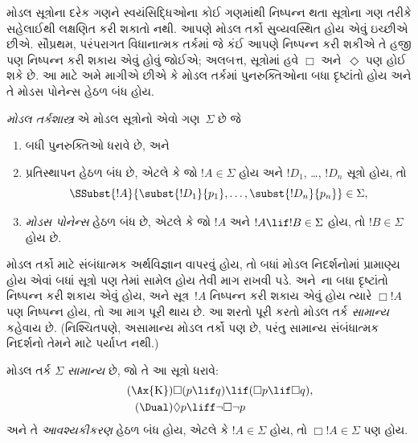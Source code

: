 \begingroup
\makeatletter{}\makeatother


\label{guunit:OLP-0429}


મોડલ સૂત્રોના દરેક ગણને સ્વયંસિદ્ધિઓના કોઈ ગણમાંથી નિષ્પન્ન થતા
સૂત્રોના ગણ તરીકે સહેલાઈથી લક્ષણિત કરી શકાતો નથી. આપણે મોડલ તર્કો
સુવ્યવસ્થિત હોય એવું ઇચ્છીએ છીએ. સૌપ્રથમ, પરંપરાગત વિધાનાત્મક તર્કમાં
જે કંઈ આપણે નિષ્પન્ન કરી શકીએ તે હજી પણ નિષ્પન્ન કરી શકાય એવું હોવું જોઈએ;
અલબત્ત, સૂત્રોમાં હવે $\Box$
    અને~$\Diamond$ પણ હોઈ શકે છે. આ માટે
અમે માગીએ છીએ કે મોડલ તર્કમાં પુનરુક્તિઓના બધા દૃષ્ટાંતો હોય અને તે
મોડસ પોનેન્સ હેઠળ બંધ હોય.

\begin{defn}
  \emph{મોડલ તર્કશાસ્ત્ર} એ મોડલ સૂત્રોનો એવો ગણ~$\Sigma$ છે જે
  \begin{enumerate}
  \item બધી પુનરુક્તિઓ ધરાવે છે, અને
  \item પ્રતિસ્થાપન હેઠળ બંધ છે, એટલે કે જો $!A \in \Sigma$ હોય અને
    $!D_1$, \dots, $!D_n$ સૂત્રો હોય, તો
    \[
    \SSubst{!A}{\subst{!D_1}{p_1}, \dots, \subst{!D_n}{p_n}} \in \Sigma,
    \]
    \item \emph{મોડસ પોનેન્સ} હેઠળ બંધ છે, એટલે કે જો $!A$ અને $!A
      \lif !B \in \Sigma$ હોય, તો $!B \in \Sigma$ હોય છે.
  \end{enumerate}
\end{defn}

મોડલ તર્કો માટે સંબંધાત્મક અર્થવિજ્ઞાન વાપરવું હોય, તો બધાં મોડલ
નિદર્શનોમાં પ્રામાણ્ય હોય એવાં બધાં સૂત્રો પણ તેમાં સામેલ હોય તેવી
માગ રાખવી પડે.  અને~\Dual{}ના બધા દૃષ્ટાંતો
નિષ્પન્ન કરી શકાય એવું હોય, અને સૂત્ર~$!A$ નિષ્પન્ન કરી શકાય એવું હોય ત્યારે
$\Box !A$ પણ નિષ્પન્ન હોય, તો આ માગ પૂરી થાય છે. આ શરતો પૂરી કરતો
મોડલ તર્ક \emph{સામાન્ય} કહેવાય છે. (નિશ્ચિતપણે, અસામાન્ય મોડલ તર્કો પણ
છે, પરંતુ સામાન્ય સંબંધાત્મક નિદર્શનો તેમને માટે પર્યાપ્ત નથી.)

\begin{defn}
  મોડલ તર્ક $\Sigma$ \emph{સામાન્ય} છે, જો તે આ સૂત્રો ધરાવે:
  \begin{align*}
    \tag{\Ax{K}} & \Box(p \lif q) \lif (\Box p \lif \Box q),
    \\
      \tag{\Dual} & \Diamond p \liff \lnot\Box\lnot p
  \end{align*}
  અને તે \emph{આવશ્યકીકરણ} હેઠળ બંધ હોય, એટલે કે $!A \in
  \Sigma$ હોય, તો $\Box !A \in \Sigma$ પણ હોય.
\end{defn}

